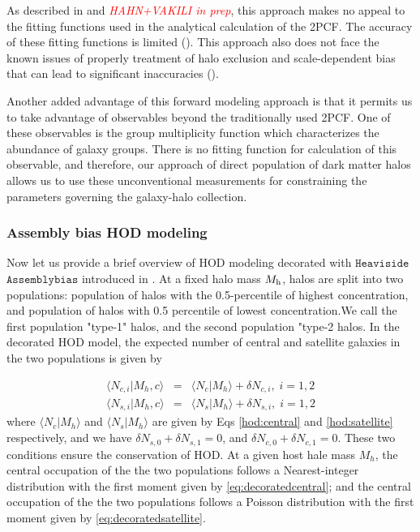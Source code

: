 \documentclass[12pt, preprint]{emulateapj}
\newcommand{\todo}[1]{{\em \textcolor{red}{ #1}}}
\begin{document}
As described in \citealt{decorated} and \todo{HAHN+VAKILI in prep}, this approach makes no appeal to the fitting functions used in the analytical calculation of the 2PCF. The accuracy of these fitting functions is limited (\citealt{tinker08,tinker10,watson13}). This approach also does not face the known issues of properly treatment of halo exclusion and scale-dependent bias that can lead to significant inaccuracies (\citealt{vdb13}). 

Another added advantage of this forward modeling approach is that it permits us to take advantage of observables beyond the traditionally used 2PCF. One of these observables is the group multiplicity function which characterizes the abundance of galaxy groups. There is no fitting function for calculation of this observable, and therefore, our approach of direct population of dark matter halos allows us to use these unconventional measurements for constraining the parameters governing the galaxy-halo collection. 

\subsubsection{Assembly bias HOD modeling}\label{subsubsec:decorated}
Now let us provide a brief overview of HOD modeling decorated with $\mathtt{Heaviside}$ $\mathtt{Assemblybias}$ introduced in \citealt{decorated}. At a fixed halo mass $M_{\rm h}$, halos are split into two populations: population of halos with the 0.5-percentile of highest concentration, and population of halos with 0.5 percentile of lowest concentration.We call the first population "type-1" halos, and the second population "type-2 halos. In the decorated HOD model, the expected number of central and satellite galaxies in the two populations is given by

\begin{eqnarray}
\langle N_{c,i} | M_{h},c\rangle &=& \langle N_{c} | M_{h}\rangle + \delta N _{c,i}, \; i=1,2 \label{eq:decoratedcentral} \\
\langle N_{s,i} | M_{h},c\rangle &=& \langle N_{s} | M_{h}\rangle + \delta N _{s,i}, \; i=1,2 \label{eq:decoratedsatellite}
\end{eqnarray}
where $\langle N_{c} | M_{h}\rangle$ and $\langle N_{s} | M_{h}\rangle$ are given by Eqs \ref{hod:central} and \ref{hod:satellite} respectively, and we have $\delta N_{s,0} + \delta N_{s,1} = 0$, and $\delta N_{c,0} + \delta N_{c,1} = 0$. These two conditions ensure the conservation of HOD. At a given host hale mass $M_{h}$, the central occupation of the the two populations follows a Nearest-integer distribution with the first moment given by \ref{eq:decoratedcentral}; and the central occupation of the the two populations follows a Poisson distribution with the first moment given by \ref{eq:decoratedsatellite}. 
\end{document}
